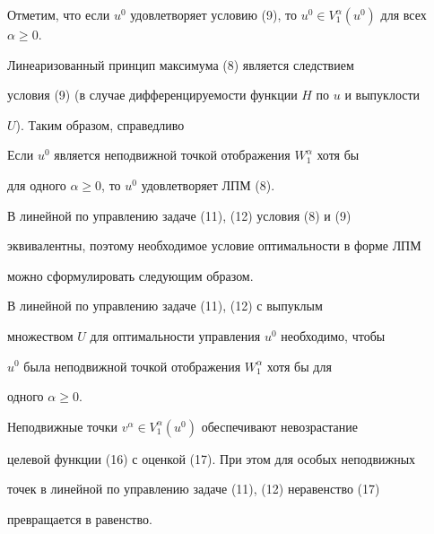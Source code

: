  


Отметим, что если $u^0$ удовлетворяет условию (9), то $u^0\in 


V^\alpha_1(u^0)$ для всех $\alpha\ge0$. 


 


Линеаризованный принцип максимума (8) является следствием 


условия (9) (в случае дифференцируемости функции $H$ по $u$ и выпуклости 


$U$). Таким образом, справедливо 


 


\begin{cor} 


Если $u^0$ является неподвижной точкой отображения $W^\alpha_1$ хотя бы 


для одного $\alpha\ge0$, то $u^0$ удовлетворяет ЛПМ (8). 


\end{cor} 


 


В линейной по управлению задаче (11), (12) условия (8) и (9) 


эквивалентны, поэтому необходимое условие оптимальности в форме ЛПМ 


можно сформулировать следующим образом. 


 


\begin{cor} 


В линейной по управлению задаче (11), (12) с выпуклым 


множеством $U$ для оптимальности управления $u^0$ необходимо, чтобы 


$u^0$ была неподвижной точкой отображения $W^\alpha_1$ хотя бы для 


одного $\alpha\ge0$. 


\end{cor} 


 


Неподвижные точки $v^\alpha\in V^\alpha_1(u^0)$ обеспечивают невозрастание 


целевой функции (16) с оценкой (17). При этом для особых неподвижных 


точек в линейной по управлению задаче (11), (12) неравенство (17) 


превращается в равенство. 


